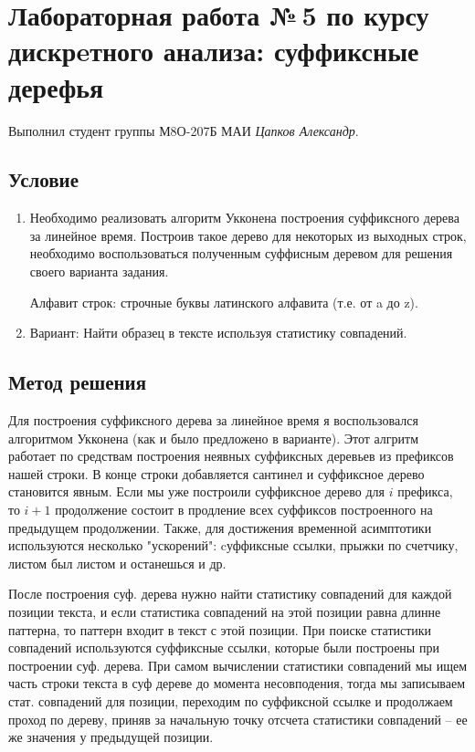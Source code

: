 \documentclass[12pt]{article}
\begin{document}
\section*{Лабораторная работа №\,5 по курсу дискрeтного анализа: суффиксные дерефья}

Выполнил студент группы М8О-207Б МАИ \textit{Цапков Александр}.

\subsection*{Условие}

\begin{enumerate}
\item Необходимо реализовать алгоритм Укконена построения суффиксного дерева за линейное время. Построив такое дерево для некоторых из выходных строк, необходимо воспользоваться полученным суффисным деревом для решения своего варианта задания.

Алфавит строк: строчные буквы латинского алфавита (т.е. от a до z).
\item Вариант: Найти образец в тексте используя статистику совпадений.
\end{enumerate}

\subsection*{Метод решения}
Для построения суффиксного дерева за линейное время я воспользовался алгоритмом
Укконена (как и было предложено в варианте). Этот алгритм работает по средствам
построения неявных суффиксных деревьев из префиксов нашей строки. В конце строки
добавляется сантинел и суффиксное дерево становится явным. Если мы уже построили
суффиксное дерево для $i$ префикса, то $i+1$ продолжение состоит в продление всех
суффиксов построенного на предыдущем продолжении. Также, для достижения временной
асимптотики используются несколько "ускорений": cуффиксные ссылки, прыжки по
счетчику, листом был листом и останешься и др. 

После построения суф. дерева нужно найти статистику совпадений для каждой позиции текста, и если статистика совпадений на этой позиции равна длинне паттерна, то
паттерн входит в текст с этой позиции. При поиске статистики совпадений используются
суффиксные ссылки, которые были построены при построении суф. дерева. При самом
вычислении статистики совпадений мы ищем часть строки текста в суф дереве до момента
несовподения, тогда мы записываем стат. совпадений для позиции, переходим по
суффиксной ссылке и продолжаем проход по дереву, приняв за начальную точку отсчета
статистики совпадений -- ее же значения у предыдущей позиции.
\end{document}
